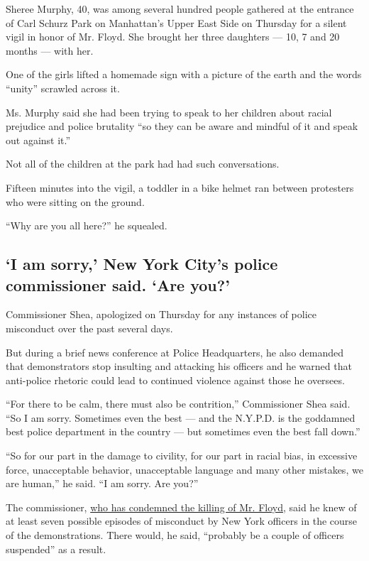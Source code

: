 Sheree Murphy, 40, was among several hundred people gathered at the
entrance of Carl Schurz Park on Manhattan's Upper East Side on Thursday
for a silent vigil in honor of Mr. Floyd. She brought her three
daughters --- 10, 7 and 20 months --- with her.

One of the girls lifted a homemade sign with a picture of the earth and
the words ``unity'' scrawled across it.

Ms. Murphy said she had been trying to speak to her children about
racial prejudice and police brutality ``so they can be aware and mindful
of it and speak out against it.''

Not all of the children at the park had had such conversations.

Fifteen minutes into the vigil, a toddler in a bike helmet ran between
protesters who were sitting on the ground.

``Why are you all here?'' he squealed.

\hypertarget{i-am-sorry-new-york-citys-police-commissioner-said-are-you}{%
\subsection{`I am sorry,' New York City's police commissioner said. `Are
you?'}\label{i-am-sorry-new-york-citys-police-commissioner-said-are-you}}

Commissioner Shea, apologized on Thursday for any instances of police
misconduct over the past several days.

But during a brief news conference at Police Headquarters, he also
demanded that demonstrators stop insulting and attacking his officers
and he warned that anti-police rhetoric could lead to continued violence
against those he oversees.

``For there to be calm, there must also be contrition,'' Commissioner
Shea said. ``So I am sorry. Sometimes even the best --- and the N.Y.P.D.
is the goddamned best police department in the country --- but sometimes
even the best fall down.''

``So for our part in the damage to civility, for our part in racial
bias, in excessive force, unacceptable behavior, unacceptable language
and many other mistakes, we are human,'' he said. ``I am sorry. Are
you?''

The commissioner,
\href{https://www.nytimes3xbfgragh.onion/2020/05/29/nyregion/nypd-officers-charged-social-distancing-arrest.html}{who
has condemned the killing of Mr. Floyd}, said he knew of at least seven
possible episodes of misconduct by New York officers in the course of
the demonstrations. There would, he said, ``probably be a couple of
officers suspended'' as a result.


